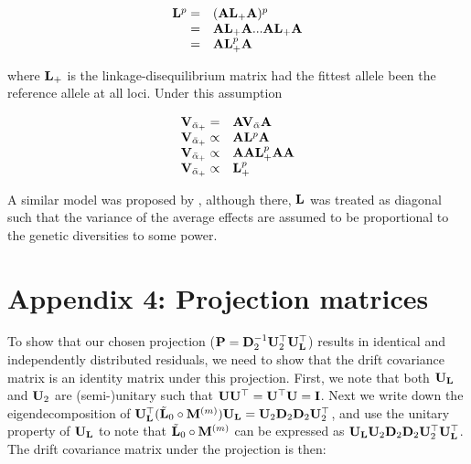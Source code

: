\documentclass[12pt]{article}
\begin{document}
\begin{bibunit}
\begin{equation}
\begin{array}{rl}
{\bf L}^{p}=&({\bf A}{\bf L}_{+}{\bf A})^{p}\\
         =&{\bf A}{\bf L}_{+}{\bf A}...{\bf A}{\bf L}_{+}{\bf A}\\
         =&{\bf A}{\bf L}_{+}^p{\bf A}\\
\end{array}
\end{equation}

where ${\bf L}_{+}$ is the linkage-disequilibrium matrix had the fittest allele been the reference allele at all loci. Under this assumption

\begin{equation}
\begin{array}{rl}
{\bf V}_{\bar{\alpha}_{+}} =& {\bf A}{\bf V}_{\bar{\alpha}}{\bf A}\\
{\bf V}_{\bar{\alpha}_{+}} \propto& {\bf A}{\bf L}^{p}{\bf A}\\
{\bf V}_{\bar{\alpha}_{+}} \propto& {\bf A}{\bf A}{\bf L}_{+}^p{\bf A}{\bf A}\\
{\bf V}_{\bar{\alpha}_{+}} \propto&{\bf L}_{+}^p\\
\end{array}
\end{equation}

A similar model was proposed by \citet{zeng2018signatures}, although there, ${\bf L}$ was treated as diagonal such that the variance of the average effects are assumed to be proportional to the genetic diversities to some power. 

\section{Appendix 4: Projection matrices}
\label{App:projection}

To show that our chosen projection (${\bf P} = {\bf D}_2^{-1}{\bf U}_2^{\top}{\bf U}_{\bf L}^{\top}$) results in identical and independently distributed residuals, we need to show that the drift covariance matrix is an identity matrix under this projection. First, we note that both ${\bf U}_{\bf L}$ and ${\bf U}_2$ are (semi-)unitary such that ${\bf U}{\bf U}^{\top}={\bf U}^{\top}{\bf U}={\bf I}$. Next we write down the eigendecomposition of ${\bf U}_{\bf L}^{\top}(\tilde{\bf L}_{0}\circ{\bf M}^{(m)}){\bf U}_{\bf L} = {\bf U}_2{\bf D}_2{\bf D}_2{\bf U}_2^{\top}$, and use the unitary property of ${\bf U}_{\bf L}$ to note that $\tilde{\bf L}_{0}\circ{\bf M}^{(m)}$ can be expressed as ${\bf U}_{\bf L}{\bf U}_2{\bf D}_2{\bf D}_2{\bf U}_2^{\top}{\bf U}_{\bf L}^{\top}$. The drift covariance matrix under the projection is then:


\end{bibunit}
\end{document}
